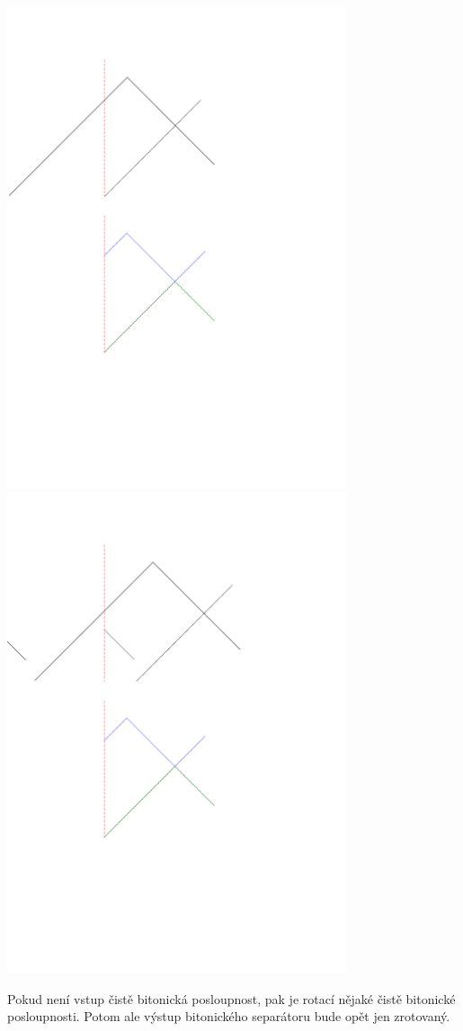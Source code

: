 \documentclass[a4paper]{article}
\begin{document}
\vspace{-1cm}
\includegraphics[width=10cm]{bitonic_1.png}
\includegraphics[width=10cm]{bitonic_2.png}
  
\vspace{-3cm}
Pokud není vstup čistě bitonická posloupnost, pak je rotací nějaké čistě bitonické posloupnosti. Potom ale výstup bitonického separátoru bude opět jen zrotovaný.
\end{document}

